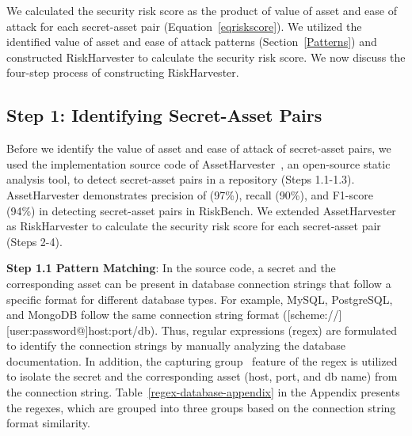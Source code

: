 
We calculated the security risk score as the product of value of asset and ease of attack for each secret-asset pair (Equation~\ref{eqriskscore}). We utilized the identified value of asset and ease of attack patterns (Section~\ref{Patterns}) and constructed RiskHarvester to calculate the security risk score. We now discuss the four-step process of constructing RiskHarvester.



\subsection{Step 1: Identifying Secret-Asset Pairs}

Before we identify the value of asset and ease of attack of secret-asset pairs, we used the implementation source code of AssetHarvester~\cite{assetharvester}, an open-source static analysis tool, to detect secret-asset pairs in a repository (Steps 1.1-1.3). AssetHarvester demonstrates precision of (97\%), recall (90\%), and F1-score (94\%) in detecting secret-asset pairs in RiskBench. We extended AssetHarvester as RiskHarvester to calculate the security risk score for each secret-asset pair (Steps 2-4).

\textbf{Step 1.1 Pattern Matching}: In the source code, a secret and the corresponding asset can be present in database connection strings that follow a specific format for different database types. For example, MySQL, PostgreSQL, and MongoDB follow the same connection string format ([scheme://][user:password@]host:port/db). Thus, regular expressions (regex) are formulated to identify the connection strings by manually analyzing the database documentation. In addition, the capturing group~\cite{capturinggroup} feature of the regex is utilized to isolate the secret and the corresponding asset (host, port, and db name) from the connection string. Table~\ref{regex-database-appendix} in the Appendix presents the regexes, which are grouped into three groups based on the connection string format similarity. 

